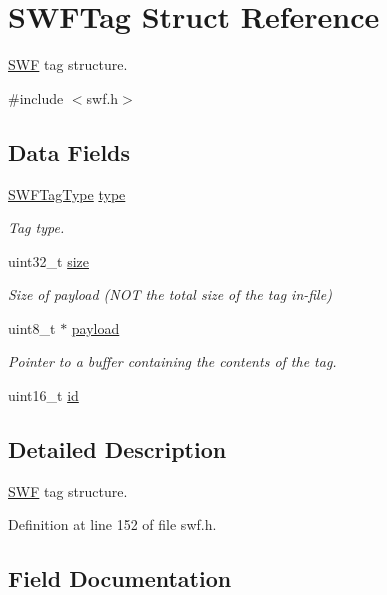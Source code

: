 \hypertarget{struct_s_w_f_tag}{}\section{S\+W\+F\+Tag Struct Reference}
\label{struct_s_w_f_tag}


\hyperlink{struct_s_w_f}{S\+W\+F} tag structure.  




{\ttfamily \#include $<$swf.\+h$>$}

\subsection*{Data Fields}
\begin{DoxyCompactItemize}
\item 
\hyperlink{swf_8h_a2197ad52b3b2be681014c5c07653c888}{S\+W\+F\+Tag\+Type} \hyperlink{struct_s_w_f_tag_adb10fb48757369896fd9c41e47a59f44}{type}
\begin{DoxyCompactList}\small\item\em Tag type. \end{DoxyCompactList}\item 
uint32\+\_\+t \hyperlink{struct_s_w_f_tag_a17e4a212bb86a411cec95574ec263815}{size}
\begin{DoxyCompactList}\small\item\em Size of payload (N\+O\+T the total size of the tag in-\/file) \end{DoxyCompactList}\item 
uint8\+\_\+t $\ast$ \hyperlink{struct_s_w_f_tag_a71d91ae229304ea8ee7ed56636d3aa18}{payload}
\begin{DoxyCompactList}\small\item\em Pointer to a buffer containing the contents of the tag. \end{DoxyCompactList}\item 
uint16\+\_\+t \hyperlink{struct_s_w_f_tag_a5ea4db43f2f7891bf5dadab7556a9a54}{id}
\end{DoxyCompactItemize}


\subsection{Detailed Description}
\hyperlink{struct_s_w_f}{S\+W\+F} tag structure. 

Definition at line 152 of file swf.\+h.



\subsection{Field Documentation}
\hypertarget{struct_s_w_f_tag_a5ea4db43f2f7891bf5dadab7556a9a54}{}
